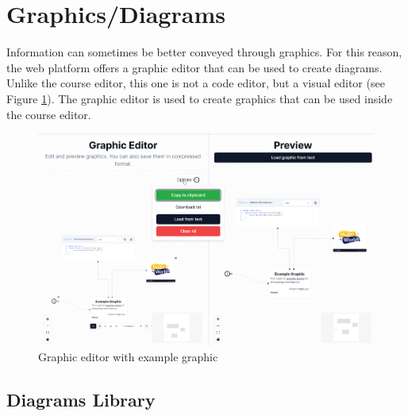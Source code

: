 \section{Graphics/Diagrams}

Information can sometimes be better conveyed through graphics. For this reason, the web platform offers a graphic editor that can be used to create diagrams. Unlike the course editor, this one is not a code editor, but a visual editor (see Figure \ref{fig:graphic-editor}). The graphic editor is used to create graphics that can be used inside the course editor.

\begin{figure}[h]
    \centering
    \includegraphics[scale=0.45]{images/graphic-editor.png}
    \caption{Graphic editor with example graphic}
    \label{fig:graphic-editor}
\end{figure}

\subsection{Diagrams Library}

